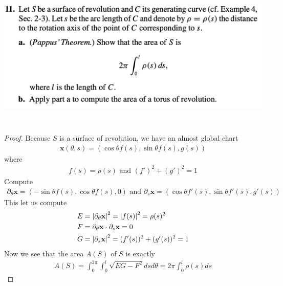 \documentclass{report}
\begin{document}
\begin{question}{}{}
\includegraphics[height=7cm,width=18cm]{hw4q12}
\end{question}
\begin{proof}
Because $S$ is a surface of revolution, we have an almost global chart 
\begin{align*}
\textbf{x}(\theta,s)=(\cos \theta f(s),\sin \theta f(s),g(s))
\end{align*}
where 
\begin{align*}
f(s)=\rho(s)\text{ and }(f')^2+(g')^2=1
\end{align*}
Compute 
\begin{align*}
\partial_\theta \textbf{x}=(-\sin \theta f(s), \cos \theta f(s),0)\text{ and }\partial_s \textbf{x}=(\cos \theta f'(s),\sin \theta f'(s),g'(s))
\end{align*}
This let us compute 
\begin{align*}
E&=\left|\partial _\theta \textbf{x}\right|^2=\left|f(s)\right|^2=\rho(s)^2 \\
F&=\partial_\theta \textbf{x}\cdot \partial_ s \textbf{x}=0 \\
G&=\left|\partial_s \textbf{x}\right|^2 = (f'(s))^2 + (g'(s))^2=1
\end{align*}
Now we see that the area $A(S)$ of $S$ is exactly 
\begin{align*}
A(S)=\int_0^{2\pi}\int_0^l \sqrt{EG-F^2}dsd\theta =2\pi \int_0^l \rho (s) ds
\end{align*}
\end{proof}
\end{document}
